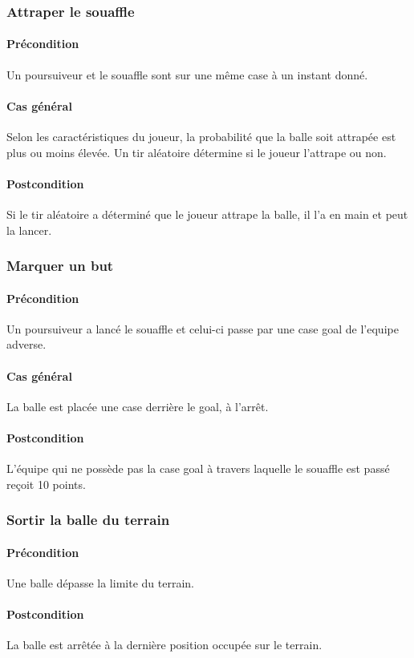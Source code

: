 \subsubsection{Attraper le souaffle}
    \paragraph{Précondition} Un \gls{poursuiveur} et le \gls{souaffle} sont sur une même case à un instant donné.
    \paragraph{Cas général} Selon les caractéristiques du joueur, la probabilité que la balle soit attrapée est plus ou moins élevée. Un tir aléatoire détermine si le joueur l'attrape ou non.
    \paragraph{Postcondition} Si le tir aléatoire a déterminé que le joueur attrape la balle, il l'a en main et peut la lancer.

\subsubsection{Marquer un but}
    \paragraph{Précondition} Un \gls{poursuiveur} a lancé le souaffle et celui-ci passe par une case goal de l'\gls{equipe} adverse. 
    \paragraph{Cas général} La balle est placée une case derrière le goal, à l'arrêt.
    \paragraph{Postcondition} L'équipe qui ne possède pas la case goal à travers laquelle le souaffle est passé reçoit 10 points.

\subsubsection{Sortir la balle du terrain}
    \paragraph{Précondition} Une balle dépasse la limite du terrain.
    \paragraph{Postcondition} La balle est arrêtée à la dernière position occupée sur le terrain.
